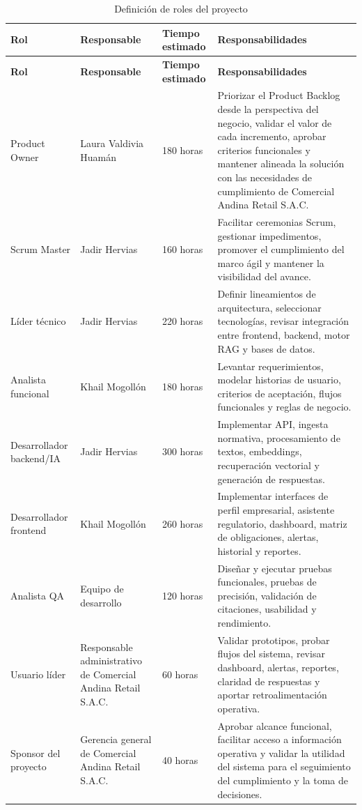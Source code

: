 \documentclass[12pt,a4paper,oneside]{report}
\begin{document}
\begin{longtable}{p{}p{}p{}p{}}
\caption{Definición de roles del proyecto}\label{tab:cap3-definicion-roles}\\
\toprule
\textbf{Rol} & \textbf{Responsable} & \textbf{Tiempo estimado} & \textbf{Responsabilidades} \\
\midrule
\endfirsthead
\toprule
\textbf{Rol} & \textbf{Responsable} & \textbf{Tiempo estimado} & \textbf{Responsabilidades} \\
\midrule
\endhead
Product Owner & Laura Valdivia Huamán & 180 horas & Priorizar el Product Backlog desde la perspectiva del negocio, validar el valor de cada incremento, aprobar criterios funcionales y mantener alineada la solución con las necesidades de cumplimiento de Comercial Andina Retail S.A.C. \\
Scrum Master & Jadir Hervias & 160 horas & Facilitar ceremonias Scrum, gestionar impedimentos, promover el cumplimiento del marco ágil y mantener la visibilidad del avance. \\
Líder técnico & Jadir Hervias & 220 horas & Definir lineamientos de arquitectura, seleccionar tecnologías, revisar integración entre frontend, backend, motor RAG y bases de datos. \\
Analista funcional & Khail Mogollón & 180 horas & Levantar requerimientos, modelar historias de usuario, criterios de aceptación, flujos funcionales y reglas de negocio. \\
Desarrollador backend/IA & Jadir Hervias & 300 horas & Implementar API, ingesta normativa, procesamiento de textos, embeddings, recuperación vectorial y generación de respuestas. \\
Desarrollador frontend & Khail Mogollón & 260 horas & Implementar interfaces de perfil empresarial, asistente regulatorio, dashboard, matriz de obligaciones, alertas, historial y reportes. \\
Analista QA & Equipo de desarrollo & 120 horas & Diseñar y ejecutar pruebas funcionales, pruebas de precisión, validación de citaciones, usabilidad y rendimiento. \\
Usuario líder & Responsable administrativo de Comercial Andina Retail S.A.C. & 60 horas & Validar prototipos, probar flujos del sistema, revisar dashboard, alertas, reportes, claridad de respuestas y aportar retroalimentación operativa. \\
Sponsor del proyecto & Gerencia general de Comercial Andina Retail S.A.C. & 40 horas & Aprobar alcance funcional, facilitar acceso a información operativa y validar la utilidad del sistema para el seguimiento del cumplimiento y la toma de decisiones. \\
\bottomrule
\end{longtable}
\end{document}
